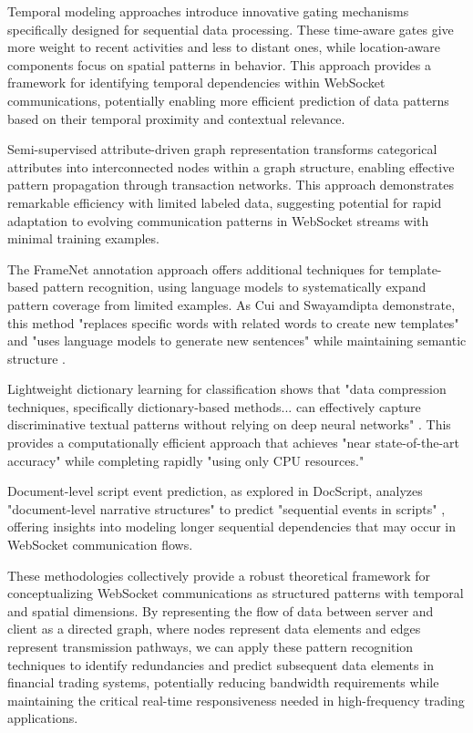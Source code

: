 \documentclass[a4paper, 11pt, twoside, openright]{report}
\begin{document}
Temporal modeling approaches introduce innovative gating mechanisms specifically designed for sequential data processing. These time-aware gates give more weight to recent activities and less to distant ones, while location-aware components focus on spatial patterns in behavior. This approach provides a framework for identifying temporal dependencies within WebSocket communications, potentially enabling more efficient prediction of data patterns based on their temporal proximity and contextual relevance.

Semi-supervised attribute-driven graph representation transforms categorical attributes into interconnected nodes within a graph structure, enabling effective pattern propagation through transaction networks. This approach demonstrates remarkable efficiency with limited labeled data, suggesting potential for rapid adaptation to evolving communication patterns in WebSocket streams with minimal training examples.

The FrameNet annotation approach offers additional techniques for template-based pattern recognition, using language models to systematically expand pattern coverage from limited examples. As Cui and Swayamdipta demonstrate, this method "replaces specific words with related words to create new templates" and "uses language models to generate new sentences" while maintaining semantic structure \cite{cui2024annotating}.

Lightweight dictionary learning for classification shows that "data compression techniques, specifically dictionary-based methods... can effectively capture discriminative textual patterns without relying on deep neural networks" \cite{LZWDict2024}. This provides a computationally efficient approach that achieves "near state-of-the-art accuracy" while completing rapidly "using only CPU resources."

Document-level script event prediction, as explored in DocScript, analyzes "document-level narrative structures" to predict "sequential events in scripts" \cite{mathur-etal-2024-docscript}, offering insights into modeling longer sequential dependencies that may occur in WebSocket communication flows.

These methodologies collectively provide a robust theoretical framework for conceptualizing WebSocket communications as structured patterns with temporal and spatial dimensions. By representing the flow of data between server and client as a directed graph, where nodes represent data elements and edges represent transmission pathways, we can apply these pattern recognition techniques to identify redundancies and predict subsequent data elements in financial trading systems, potentially reducing bandwidth requirements while maintaining the critical real-time responsiveness needed in high-frequency trading applications.
\end{document}

